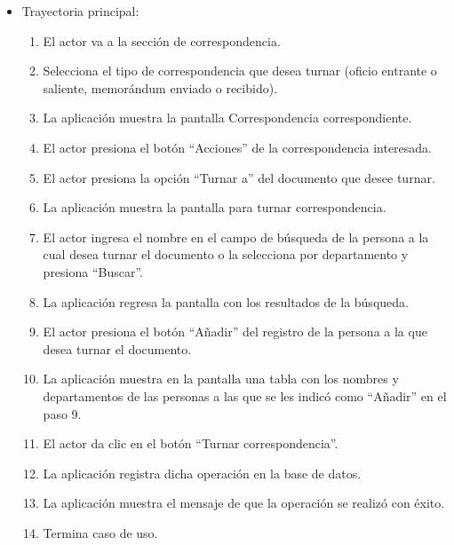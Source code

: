 \begin{itemize}
	\item Trayectoria principal:
	\begin{enumerate}
		\item	El actor va a la sección de correspondencia.
\item	Selecciona el tipo de correspondencia que desea turnar (oficio entrante o saliente, memorándum enviado o recibido).
\item	La aplicación muestra la pantalla  Correspondencia correspondiente.
\item	El actor presiona el botón “Acciones” de la correspondencia interesada.
\item	El actor presiona la opción “Turnar a” del documento que desee turnar.
\item	La aplicación muestra la pantalla  para turnar correspondencia.
\item	El actor ingresa el nombre en el campo de búsqueda de la persona a la cual desea turnar el documento o la selecciona por departamento y presiona “Buscar”.
\item	La aplicación regresa la pantalla con los resultados de la búsqueda.
\item	El actor presiona el botón “Añadir” del registro de la persona a la que desea turnar el documento.
\item	La aplicación muestra en la pantalla una tabla con los nombres y departamentos de las personas a las que se les indicó como “Añadir” en el paso 9.
\item	El actor da clic en el botón “Turnar correspondencia”.
\item	La aplicación registra dicha operación en la base de datos.
\item	La aplicación muestra el mensaje  de que la operación se realizó con éxito.
\item	Termina caso de uso.

	\end{enumerate}
	
\end{itemize}

